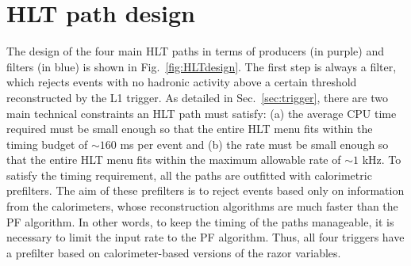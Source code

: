 \section{HLT path design}

The design of the four main HLT paths in terms of producers (in
purple) and filters (in blue) is shown
in Fig.~\ref{fig:HLTdesign}. The first step is always a filter, which
rejects events with no hadronic activity above a certain threshold reconstructed by the L1 trigger.
As detailed in Sec.~\ref{sec:trigger}, there are two main technical
constraints an HLT path must satisfy: (a) the average CPU time required must be
small enough so that the entire HLT menu fits within the timing budget
 of $\sim160$ \unit{ms} per event and (b) the rate must
be small enough so that the entire HLT menu fits within the maximum
allowable rate  of $\sim1$ \unit{kHz}. To satisfy the timing
requirement, all the paths are outfitted with
calorimetric prefilters. The aim of these prefilters is to reject
events based only on information from the calorimeters, whose
reconstruction algorithms are much faster than the PF algorithm. In
other words, to keep the timing of the paths manageable, it is
necessary to limit the input rate to the PF algorithm. Thus, all four
triggers have a prefilter based on calorimeter-based versions of the razor
variables.

